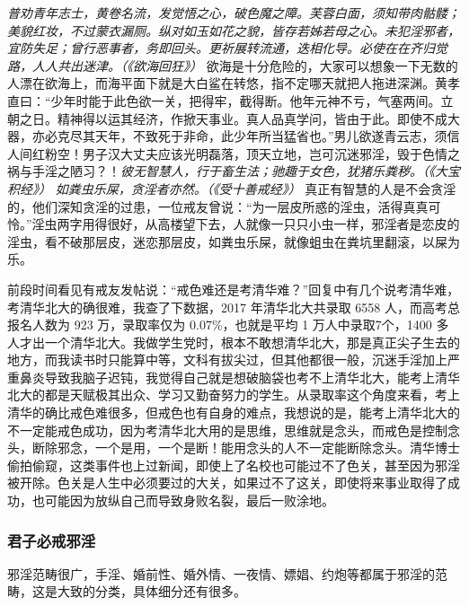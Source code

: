 \textit{普劝青年志士，黄卷名流，发觉悟之心，破色魔之障。芙蓉白面，须知带肉骷髅；美貌红妆，不过蒙衣漏厕。纵对如玉如花之貌，皆存若姊若母之心。未犯淫邪者，宜防失足；曾行恶事者，务即回头。更祈展转流通，迭相化导。必使在在齐归觉路，人人共出迷津。（《欲海回狂》）} 欲海是十分危险的，大家可以想象一下无数的人漂在欲海上，而海平面下就是大白鲨在转悠，指不定哪天就把人拖进深渊。黄孝直曰：“少年时能于此色欲一关，把得牢，截得断。他年元神不亏，气塞两间。立朝之日。精神得以运其经济，作掀天事业。真人品真学问，皆由于此。即使不成大器，亦必克尽其天年，不致死于非命，此少年所当猛省也。”男儿欲遂青云志，须信人间红粉空！男子汉大丈夫应该光明磊落，顶天立地，岂可沉迷邪淫，毁于色情之祸与手淫之陋习？！\textit{彼无智慧人，行于畜生法；驰趣于女色，犹猪乐粪秽。（《大宝积经》）} \textit{如粪虫乐屎，贪淫者亦然。（《受十善戒经》）} 真正有智慧的人是不会贪淫的，他们深知贪淫的过患，一位戒友曾说：“为一层皮所惑的淫虫，活得真真可怜。”淫虫两字用得很好，从高楼望下去，人就像一只只小虫一样，邪淫者是恋皮的淫虫，看不破那层皮，迷恋那层皮，如粪虫乐屎，就像蛆虫在粪坑里翻滚，以屎为乐。

前段时间看见有戒友发帖说：“戒色难还是考清华难？”回复中有几个说考清华难，考清华北大的确很难，我查了下数据，2017 年清华北大共录取 6558 人，而高考总报名人数为 923 万，录取率仅为 0.07\%，也就是平均 1 万人中录取7个，1400 多人才出一个清华北大。我做学生党时，根本不敢想清华北大，那是真正尖子生去的地方，而我读书时只能算中等，文科有拔尖过，但其他都很一般，沉迷手淫加上严重鼻炎导致我脑子迟钝，我觉得自己就是想破脑袋也考不上清华北大，能考上清华北大的都是天赋极其出众、学习又勤奋努力的学生。从录取率这个角度来看，考上清华的确比戒色难很多，但戒色也有自身的难点，我想说的是，能考上清华北大的不一定能戒色成功，因为考清华北大用的是思维，思维就是念头，而戒色是控制念头，断除邪念，一个是用，一个是断！能用念头的人不一定能断除念头。清华博士偷拍偷窥，这类事件也上过新闻，即使上了名校也可能过不了色关，甚至因为邪淫被开除。色关是人生中必须要过的大关，如果过不了这关，即使将来事业取得了成功，也可能因为放纵自己而导致身败名裂，最后一败涂地。

\subsubsection{君子必戒邪淫}

邪淫范畴很广，手淫、婚前性、婚外情、一夜情、嫖娼、约炮等都属于邪淫的范畴，这是大致的分类，具体细分还有很多。

